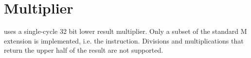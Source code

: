 \chapter{Multiplier}

\rvcore uses a single-cycle 32 bit lower result multiplier. Only a subset of the
standard M extension is implemented, i.e. the  instruction.
Divisions and multiplications that return the upper half of the result are not
supported.
